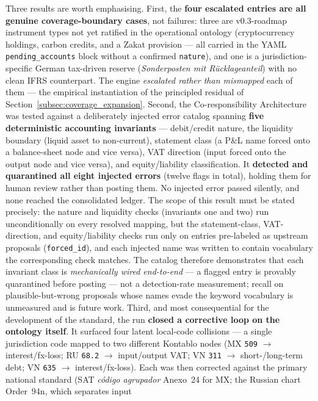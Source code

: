 Three results are worth emphasising. First, the \textbf{four escalated entries are
all genuine coverage-boundary cases}, not failures: three are v0.3-roadmap
instrument types not yet ratified in the operational ontology (cryptocurrency
holdings, carbon credits, and a Zakat provision --- all carried in the YAML
\texttt{pending\_accounts} block without a confirmed \texttt{nature}), and one
is a jurisdiction-specific German tax-driven reserve
(\textit{Sonderposten mit R\"ucklageanteil}) with no clean IFRS counterpart.
The engine \emph{escalated rather than mismapped} each of them --- the
empirical instantiation of the principled residual of
Section~\ref{subsec:coverage_expansion}. Second, the Co-responsibility
Architecture was tested against a deliberately injected error catalog spanning
\textbf{five deterministic accounting invariants} --- debit/credit nature,
the liquidity boundary (liquid asset to non-current), statement class (a P\&L
name forced onto a balance-sheet node and vice versa), VAT direction (input
forced onto the output node and vice versa), and equity/liability
classification. It \textbf{detected and quarantined all eight injected errors}
(twelve flags in total), holding them for human review rather than posting them.
No injected error passed silently, and none reached the consolidated ledger.
The scope of this result must be stated precisely: the nature and liquidity
checks (invariants one and two) run unconditionally on every resolved mapping,
but the statement-class, VAT-direction, and equity/liability checks run only
on entries pre-labeled as upstream proposals (\texttt{forced\_id}), and each
injected name was written to contain vocabulary the corresponding check
matches. The catalog therefore demonstrates that each invariant class is
\emph{mechanically wired end-to-end} --- a flagged entry is provably
quarantined before posting --- not a detection-rate measurement; recall on
plausible-but-wrong proposals whose names evade the keyword vocabulary is
unmeasured and is future work. Third, and most consequential
for the development of the standard, the run \textbf{closed a corrective loop on
the ontology itself}. It surfaced four latent local-code collisions --- a single
jurisdiction code mapped to two different Kontablo nodes (MX \texttt{509}
$\to$ interest/fx-loss; RU \texttt{68.2} $\to$ input/output VAT; VN \texttt{311}
$\to$ short-/long-term debt; VN \texttt{635} $\to$ interest/fx-loss). Each was
then corrected against the primary national standard (SAT \emph{c\'odigo
agrupador} Anexo~24 for MX; the Russian chart Order~94n, which separates input
